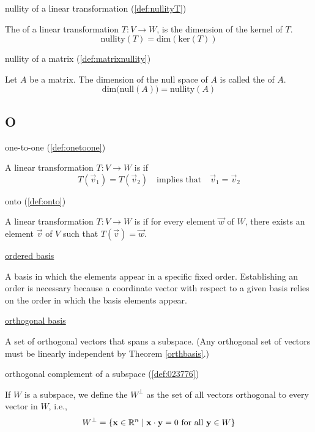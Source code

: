 \documentclass{ximera}
\begin{document}
nullity of a linear transformation (\ref{def:nullityT})
\begin{expandable}{}{}
    The  of a linear transformation $T:V\rightarrow W$, is the dimension of the kernel of $T$.
$$\mbox{nullity}(T)=\mbox{dim}(\mbox{ker}(T))$$
\end{expandable}

nullity of a matrix (\ref{def:matrixnullity})
\begin{expandable}{}{}
    Let $A$ be a matrix.  The dimension of the null space of $A$ is called the  of $A$.
$$\mbox{dim}\Big(\mbox{null}(A)\Big)=\mbox{nullity}(A)$$
\end{expandable}


\subsection*{O}
one-to-one (\ref{def:onetoone})
\begin{expandable}{}{}
    A linear transformation $T:V\rightarrow W$ is  if 
$$T(\vec{v}_1)=T(\vec{v}_2)\quad \text{implies that}\quad \vec{v}_1=\vec{v}_2$$
\end{expandable}

onto (\ref{def:onto})
\begin{expandable}{}{}
    A linear transformation $T:V\rightarrow W$ is  if for every element $\vec{w}$ of $W$, there exists an element $\vec{v}$ of $V$ such that $T(\vec{v})=\vec{w}$.
\end{expandable}

\href{https://ximera.osu.edu/linearalgebradzv3/LinearAlgebraInteractiveIntro/VSP-0060/main}{ordered basis}
\begin{expandable}{}{}
    A basis in which the elements appear in a specific fixed order.  Establishing an order is necessary because a coordinate vector with respect to a given basis relies on the order in which the basis elements appear.
\end{expandable}

\href{https://ximera.osu.edu/linearalgebradzv3/LinearAlgebraInteractiveIntro/RTH-0010/main}{orthogonal basis}
\begin{expandable}{}{}
    A set of orthogonal vectors that spans a subspace. (Any orthogonal set of vectors must be linearly independent by Theorem \ref{orthbasis}.)
\end{expandable}

orthogonal complement of a subspace (\ref{def:023776})
\begin{expandable}{}{}
    If $W$ is a subspace, we define the  $W^\perp$ as the set of all vectors orthogonal to every vector in $W$, i.e.,
\begin{equation*}
W^\perp = \{\mathbf{x} \in\mathbb{R}^n \mid \mathbf{x} \cdot \mathbf{y} = 0 \mbox{ for all } \mathbf{y} \in W\}
\end{equation*}
\end{expandable}
\end{document}
